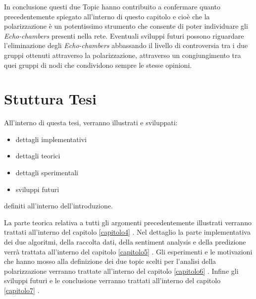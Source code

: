 In conclusione questi due Topic hanno contribuito a confermare quanto precedentemente spiegato all'interno di questo capitolo e cioè che la polarizzazione è un potentissimo strumento che consente di poter individuare gli \textit{Echo-chambers} presenti nella rete. %
Eventuali sviluppi futuri possono riguardare l'eliminazione degli \textit{Echo-chambers} abbassando il livello di controversia tra i due gruppi ottenuti attraverso la polarizzazione, attraverso un congiungimento tra quei gruppi di nodi che condividono sempre le stesse opinioni.
\newpage
\section{Stuttura Tesi}
All'interno di questa tesi, verranno illustrati e sviluppati:
\begin{itemize}
\item dettagli implementativi
\item dettagli teorici
\item dettagli sperimentali
\item sviluppi futuri
\end{itemize}
definiti all'interno dell'introduzione.

La parte teorica relativa a tutti gli argomenti precedentemente illustrati verranno trattati all'interno del capitolo  \ref{capitolo4} \textit{}.
Nel dettaglio la parte implementativa dei due algoritmi, della raccolta dati, della sentiment analysis e della predizione verrà trattata all'interno del capitolo \ref{capitolo5} \textit{}.
Gli esperimenti e le motivazioni  che hanno mosso alla definizione dei due topic scelti per l'analisi della polarizzazione verranno trattate all'interno del capitolo  \ref{capitolo6} \textit{}.
Infine gli sviluppi futuri e le conclusione verranno trattati all'interno del capitolo  \ref{capitolo7} \textit{}.
